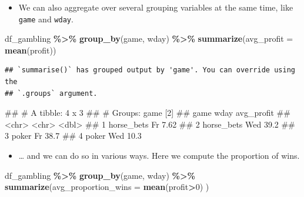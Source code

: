 \documentclass[
]{book}
\newenvironment{Shaded}{\begin{snugshade}}{\end{snugshade}}
\newcommand{\AttributeTok}[1]{\textcolor[rgb]{0.13,0.29,0.53}{#1}}
\newcommand{\DecValTok}[1]{\textcolor[rgb]{0.00,0.00,0.81}{#1}}
\newcommand{\FunctionTok}[1]{\textcolor[rgb]{0.13,0.29,0.53}{\textbf{#1}}}
\newcommand{\NormalTok}[1]{#1}
\newcommand{\SpecialCharTok}[1]{\textcolor[rgb]{0.81,0.36,0.00}{\textbf{#1}}}
\providecommand{\tightlist}{%
  \setlength{\itemsep}{0pt}\setlength{\parskip}{0pt}}
\begin{document}
\begin{itemize}
\tightlist
\item
  We can also aggregate over several grouping variables at the same time, like \texttt{game} and \texttt{wday}.
\end{itemize}

\begin{Shaded}
\begin{Highlighting}[]
\NormalTok{df\_gambling }\SpecialCharTok{\%\textgreater{}\%} 
  \FunctionTok{group\_by}\NormalTok{(game, wday) }\SpecialCharTok{\%\textgreater{}\%} 
  \FunctionTok{summarize}\NormalTok{(}\AttributeTok{avg\_profit =} \FunctionTok{mean}\NormalTok{(profit))}
\end{Highlighting}
\end{Shaded}

\begin{verbatim}
## `summarise()` has grouped output by 'game'. You can override using the
## `.groups` argument.
\end{verbatim}

\begin{Shaded}
\begin{Highlighting}[]
\NormalTok{\#\# \# A tibble: 4 x 3}
\NormalTok{\#\# \# Groups:   game [2]}
\NormalTok{\#\#   game       wday  avg\_profit}
\NormalTok{\#\#   \textless{}chr\textgreater{}      \textless{}chr\textgreater{}      \textless{}dbl\textgreater{}}
\NormalTok{\#\# 1 horse\_bets Fr          7.62}
\NormalTok{\#\# 2 horse\_bets Wed        39.2 }
\NormalTok{\#\# 3 poker      Fr         38.7 }
\NormalTok{\#\# 4 poker      Wed        10.3}
\end{Highlighting}
\end{Shaded}

\begin{itemize}
\tightlist
\item
  \ldots{} and we can do so in various ways. Here we compute the proportion of wins.
\end{itemize}

\begin{Shaded}
\begin{Highlighting}[]
\NormalTok{df\_gambling }\SpecialCharTok{\%\textgreater{}\%} 
  \FunctionTok{group\_by}\NormalTok{(game, wday) }\SpecialCharTok{\%\textgreater{}\%} 
  \FunctionTok{summarize}\NormalTok{(}\AttributeTok{avg\_proportion\_wins =} \FunctionTok{mean}\NormalTok{(profit}\SpecialCharTok{\textgreater{}}\DecValTok{0}\NormalTok{) )}
\end{Highlighting}
\end{Shaded}
\end{document}
